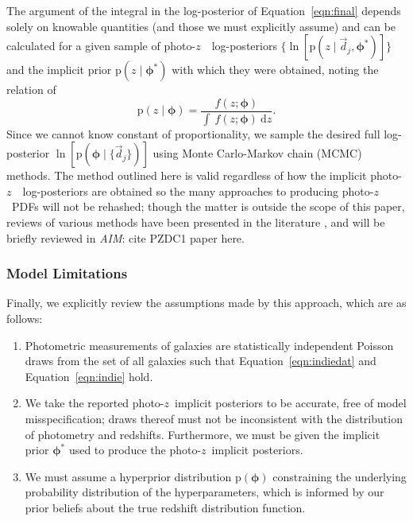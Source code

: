 \documentclass[iop]{emulateapj}
\newcommand{\todo}[3]{{\color{#2}\emph{#1}: #3}}
\newcommand{\aim}[1]{\todo{AIM}{red}{#1}}
\newcommand{\Eq}[1]{Equation~\ref{#1}}
\newcommand{\data}{\ensuremath{\vec{d}}}
\newcommand{\pr}[1]{\ensuremath{\mathrm{p}(#1)}}
\newcommand{\gvn}{\mid}%
\newcommand{\integral}[2]{\ensuremath{\int\ #1\ \mathrm{d} #2}}
\newcommand{\pz}{photo-$z$~}
\newcommand{\pzpdf}{\pz PDF}
\newcommand{\pzip}{\pz implicit posterior}
\newcommand{\bvec}[1]{{\ensuremath{\boldsymbol{#1}}}}
\newcommand{\ndphi}{\bvec{\phi}}
\begin{document}
The argument of the integral in the log-posterior of \Eq{eqn:final} depends 
solely on knowable quantities (and those we must explicitly assume) and can be 
calculated for a given sample of \pz\ log-posteriors $\{\ln[\pr{z \gvn 
\data_{j}, \ndphi^{*}}]\}$ and the implicit prior $\pr{z \gvn \ndphi^{*}}$ with 
which they were obtained, noting the relation of 
\begin{equation}
\label{eqn:params}
\pr{z \gvn \ndphi} = \frac{f(z; \ndphi)}{\integral{f(z; \ndphi)}{z}}.
\end{equation}
Since we cannot know constant of proportionality, we sample the desired full 
log-posterior $\ln[\pr{\ndphi \gvn \{\data_{j}\}}]$ using Monte Carlo-Markov 
chain (MCMC) methods.  
The method outlined here is valid regardless of how the implicit \pz\ 
log-posteriors are obtained so the many approaches to producing \pzpdf s will 
not be rehashed; though the matter is outside the scope of this paper, reviews 
of various methods have been presented in the literature 
\citep{sheldon_photometric_2012, Ball2008, carrasco_kind_tpz:_2013, 
carrasco_kind_exhausting_2014}, and will be briefly reviewed in \aim{cite PZDC1 
paper here}.

\subsubsection{Model Limitations}
\label{sec:limitations}

Finally, we explicitly review the assumptions made by this approach, which are 
as follows:

\begin{enumerate}
	\item Photometric measurements of galaxies are statistically 
independent Poisson draws from the set of all galaxies such that 
\Eq{eqn:indiedat} and \Eq{eqn:indie} hold.
	\item We take the reported \pzip s to be accurate, free of model 
misspecification; draws thereof must not be inconsistent with the distribution 
of photometry and redshifts.
	Furthermore, we must be given the implicit prior $\ndphi^{*}$ used to 
produce the \pzip s.
	\item We must assume a hyperprior distribution $\pr{\ndphi}$ 
constraining the underlying probability distribution of the hyperparameters, 
which is informed by our prior beliefs about the true redshift distribution 
function.
\end{enumerate}
\end{document}

